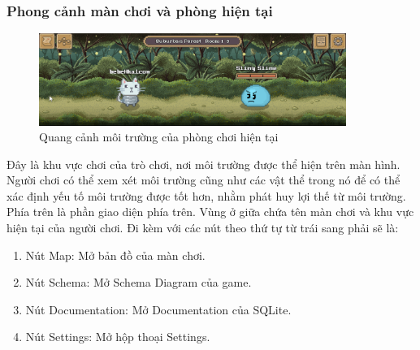 \subsubsection{Phong cảnh màn chơi và phòng hiện tại}
\begin{figure}[H]
	\centering
	\includegraphics[width=10cm]{Images/CurrentRoom.png}
	\vspace{0.5cm}
	\caption{Quang cảnh môi trường của phòng chơi hiện tại}
\end{figure}
\hspace*{1cm} Đây là khu vực chơi của trò chơi, nơi môi trường được thể hiện trên màn hình. Người chơi có thể xem xét môi trường cũng như các vật thể trong nó để có thể xác định yếu tố môi trường được tốt hơn, nhằm phát huy lợi thế từ môi trường.\\
\hspace*{1cm} Phía trên là phần giao diện phía trên. Vùng ở giữa chứa tên màn chơi và khu vực hiện tại của người chơi. Đi kèm với các nút theo thứ tự từ trái sang phải sẽ là: 
\begin{enumerate}
	\item Nút Map: Mở bản đồ của màn chơi.
	\item Nút Schema: Mở Schema Diagram của game.
	\item Nút Documentation: Mở Documentation của SQLite.
	\item Nút Settings: Mở hộp thoại Settings.
\end{enumerate}